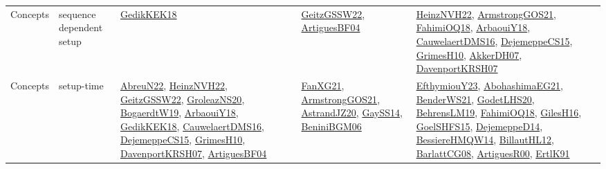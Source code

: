 {\begin{longtable}{lp{3cm}>{\raggedright}p{6cm}>{\raggedright}p{6cm}p{8cm}}
Concepts & sequence dependent setup & \href{articles/GedikKEK18.pdf}{GedikKEK18}\cite{GedikKEK18} & \href{papers/GeitzGSSW22.pdf}{GeitzGSSW22}\cite{GeitzGSSW22}, \href{papers/ArtiguesBF04.pdf}{ArtiguesBF04}\cite{ArtiguesBF04} & \href{articles/HeinzNVH22.pdf}{HeinzNVH22}\cite{HeinzNVH22}, \href{papers/ArmstrongGOS21.pdf}{ArmstrongGOS21}\cite{ArmstrongGOS21}, \href{articles/FahimiOQ18.pdf}{FahimiOQ18}\cite{FahimiOQ18}, \href{papers/ArbaouiY18.pdf}{ArbaouiY18}\cite{ArbaouiY18}, \href{papers/CauwelaertDMS16.pdf}{CauwelaertDMS16}\cite{CauwelaertDMS16}, \href{papers/DejemeppeCS15.pdf}{DejemeppeCS15}\cite{DejemeppeCS15}, \href{papers/GrimesH10.pdf}{GrimesH10}\cite{GrimesH10}, \href{papers/AkkerDH07.pdf}{AkkerDH07}\cite{AkkerDH07}, \href{papers/DavenportKRSH07.pdf}{DavenportKRSH07}\cite{DavenportKRSH07}\\
Concepts & setup-time & \href{articles/AbreuN22.pdf}{AbreuN22}\cite{AbreuN22}, \href{articles/HeinzNVH22.pdf}{HeinzNVH22}\cite{HeinzNVH22}, \href{papers/GeitzGSSW22.pdf}{GeitzGSSW22}\cite{GeitzGSSW22}, \href{papers/GroleazNS20.pdf}{GroleazNS20}\cite{GroleazNS20}, \href{papers/BogaerdtW19.pdf}{BogaerdtW19}\cite{BogaerdtW19}, \href{papers/ArbaouiY18.pdf}{ArbaouiY18}\cite{ArbaouiY18}, \href{articles/GedikKEK18.pdf}{GedikKEK18}\cite{GedikKEK18}, \href{papers/CauwelaertDMS16.pdf}{CauwelaertDMS16}\cite{CauwelaertDMS16}, \href{papers/DejemeppeCS15.pdf}{DejemeppeCS15}\cite{DejemeppeCS15}, \href{papers/GrimesH10.pdf}{GrimesH10}\cite{GrimesH10}, \href{papers/DavenportKRSH07.pdf}{DavenportKRSH07}\cite{DavenportKRSH07}, \href{papers/ArtiguesBF04.pdf}{ArtiguesBF04}\cite{ArtiguesBF04} & \href{articles/FanXG21.pdf}{FanXG21}\cite{FanXG21}, \href{papers/ArmstrongGOS21.pdf}{ArmstrongGOS21}\cite{ArmstrongGOS21}, \href{articles/AstrandJZ20.pdf}{AstrandJZ20}\cite{AstrandJZ20}, \href{papers/GaySS14.pdf}{GaySS14}\cite{GaySS14}, \href{papers/BeniniBGM06.pdf}{BeniniBGM06}\cite{BeniniBGM06} & \href{papers/EfthymiouY23.pdf}{EfthymiouY23}\cite{EfthymiouY23}, \href{articles/AbohashimaEG21.pdf}{AbohashimaEG21}\cite{AbohashimaEG21}, \href{papers/BenderWS21.pdf}{BenderWS21}\cite{BenderWS21}, \href{papers/GodetLHS20.pdf}{GodetLHS20}\cite{GodetLHS20}, \href{papers/BehrensLM19.pdf}{BehrensLM19}\cite{BehrensLM19}, \href{articles/FahimiOQ18.pdf}{FahimiOQ18}\cite{FahimiOQ18}, \href{papers/GilesH16.pdf}{GilesH16}\cite{GilesH16}, \href{articles/GoelSHFS15.pdf}{GoelSHFS15}\cite{GoelSHFS15}, \href{papers/DejemeppeD14.pdf}{DejemeppeD14}\cite{DejemeppeD14}, \href{papers/BessiereHMQW14.pdf}{BessiereHMQW14}\cite{BessiereHMQW14}, \href{papers/BillautHL12.pdf}{BillautHL12}\cite{BillautHL12}, \href{papers/BarlattCG08.pdf}{BarlattCG08}\cite{BarlattCG08}, \href{articles/ArtiguesR00.pdf}{ArtiguesR00}\cite{ArtiguesR00}, \href{papers/ErtlK91.pdf}{ErtlK91}\cite{ErtlK91}\\

\end{longtable}}
